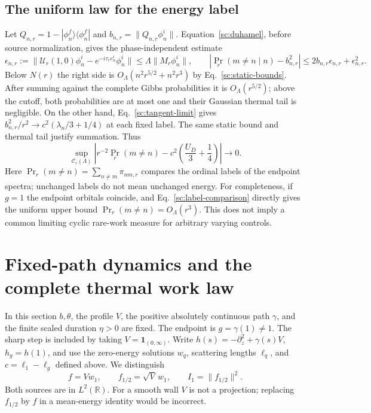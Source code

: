 \documentclass[aps,prl,reprint,superscriptaddress,longbibliography]{revtex4-2}
\begin{document}
\subsection{The uniform law for the energy label}
\label{sc:labels}

Let $Q_{n,r}=1-|\phi_n^f\rangle\langle\phi_n^f|$ and
$b_{n,r}=\|Q_{n,r}\phi_n^i\|$. Equation~\eqref{sc:duhamel}, before
source normalization, gives the phase-independent estimate
\begin{equation}
 \epsilon_{n,r}:=\|\mathcal U_r(1,0)\phi_n^i
      -e^{-i\tau_re_n^i}\phi_n^i\|
 \le\Lambda\|M_r\phi_n^i\|,
 \qquad
 |\Pr_r(m\ne n\mid n)-b_{n,r}^2|
 \le2b_{n,r}\epsilon_{n,r}+\epsilon_{n,r}^2.
 \label{sc:label-comparison}
\end{equation}
Below $N(r)$ the right side is
$O_\Lambda(n^2r^{5/2}+n^2r^3)$ by Eq.~\eqref{sc:static-bounds}.
After summing against the complete Gibbs probabilities it is
$O_\Lambda(r^{5/2})$; above the cutoff, both probabilities are at most
one and their Gaussian thermal tail is negligible. On the other hand,
Eq.~\eqref{sc:tangent-limit} gives
$b_{n,r}^2/r^2\to c^2(\lambda_n/3+1/4)$ at each fixed label.
The same static bound and thermal tail justify summation. Thus
\begin{equation}
 \boxed{\sup_{\mathcal C_r(\Lambda)}
 \left|r^{-2}\Pr_r(m\ne n)-c^2\left(\frac{U_D}{3}+\frac14\right)\right|
 \longrightarrow0.}
 \label{sc:uniform-label}
\end{equation}
Here $\Pr_r(m\ne n)=\sum_{n\ne m}\pi_{nm,r}$ compares the ordinal labels
of the endpoint spectra; unchanged labels do not mean unchanged energy.
For completeness, if $g=1$ the endpoint orbitals coincide, and
Eq.~\eqref{sc:label-comparison} directly gives the uniform upper bound
$\Pr_r(m\ne n)=O_\Lambda(r^3)$. This does not imply a common limiting
cyclic rare-work measure for arbitrary varying controls.

\section{Fixed-path dynamics and the complete thermal work law}
\label{th:fixed}

In this section $b,\theta$, the profile $V$, the positive absolutely continuous path $\gamma$, and the finite scaled duration $\eta>0$ are fixed. The endpoint is $g=\gamma(1)\ne1$. The sharp step is included by taking $V=\mathbf1_{(0,\infty)}$. Write $h(s)=-\partial_z^2+\gamma(s)V$, $h_g=h(1)$, and use the zero-energy solutions $w_q$, scattering lengths $\ell_q$, and $c=\ell_1-\ell_g$ defined above. We distinguish
\begin{equation}
 f=Vw_1,\qquad f_{1/2}=\sqrt V\,w_1,\qquad I_1=\|f_{1/2}\|^2.
 \label{th:sources}
\end{equation}
Both sources are in $L^2(\mathbb R)$. For a smooth wall $V$ is not a projection; replacing $f_{1/2}$ by $f$ in a mean-energy identity would be incorrect.
\end{document}
